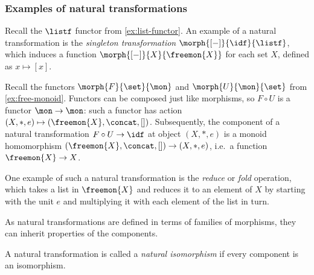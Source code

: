 \subsubsection{Examples of natural transformations}

\begin{example}[Singleton]
    Recall the \(\listf\) functor from \cref{ex:list-functor}.
    An example of a natural transformation is the
    \emph{singleton transformation} \(\morph{[-]}{\idf}{\listf}\), which
    induces a function \(\morph{[-]}{X}{\freemon{X}}\) for each set \(X\),
    defined as \(x \mapsto [x]\).
\end{example}

\begin{example}[Reduce]
    Recall the functors \(\morph{F}{\set}{\mon}\) and \(\morph{U}{\mon}{\set}\)
    from \cref{ex:free-monoid}.
    Functors can be composed just like morphisms, so \(F \circ U\) is a
    functor \(\mon \to \mon\): such a functor has action \(
        (X, *, e) \mapsto (\freemon{X}, \concat, [])
    \).
    Subsequently, the component of a natural transformation \(
        F \circ U \to \idf
    \) at object \((X, *, e)\) is a monoid homomorphism \(
        (\freemon{X}, \concat, []) \to (X, *, e)
    \), i.e.\ a function \(\freemon{X} \to X\).

    One example of such a natural transformation is the \emph{reduce} or
    \emph{fold} operation, which takes a list in \(\freemon{X}\) and reduces it
    to an element of \(X\) by starting with the unit \(e\) and multiplying it
    with each element of the list in turn.
\end{example}

As natural transformations are defined in terms of families of morphisms, they
can inherit properties of the components.

\begin{definition}
    A natural transformation is called a \emph{natural isomorphism} if every
    component is an isomorphism.
\end{definition}